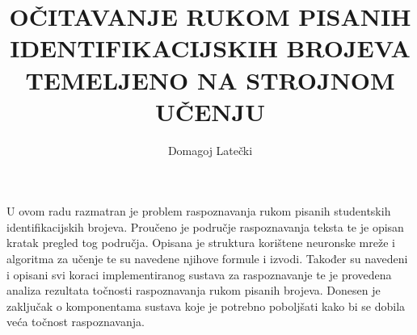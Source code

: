 \documentclass[times, utf8, diplomski]{fer}
\begin{document}

    \title{OČITAVANJE RUKOM PISANIH IDENTIFIKACIJSKIH BROJEVA TEMELJENO NA STROJNOM UČENJU}

    \author{Domagoj Latečki}

    \maketitle

    


    \listoffigures

    \listoftables

    \tableofcontents

    

    

    

    

    

    

    
    

    \appendix

    

    

    

    

    

    \begin{sazetak}
        U ovom radu razmatran je problem raspoznavanja rukom pisanih studentskih identifikacijskih brojeva. Proučeno je
        područje raspoznavanja teksta te je opisan kratak pregled tog područja. Opisana je struktura korištene neuronske
        mreže i algoritma za učenje te su navedene njihove formule i izvodi. Također su navedeni i opisani svi koraci
        implementiranog sustava za raspoznavanje te je provedena analiza rezultata točnosti raspoznavanja rukom pisanih
        brojeva. Donesen je zaključak o komponentama sustava koje je potrebno poboljšati kako bi se dobila veća točnost
        raspoznavanja.

    \end{sazetak}
\end{document}
